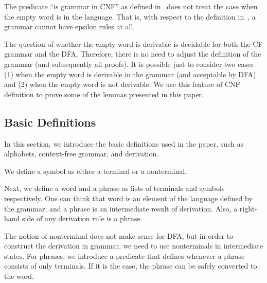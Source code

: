 The predicate ``is grammar in CNF'' as defined in~\cite{smolkaHofmann2016} does not treat the case when the empty word is in the language. That is, with respect to the definition in~\cite{smolkaHofmann2016}, a grammar cannot have epsilon rules at all.

The question of whether the empty word is derivable is decidable for both the CF grammar and the DFA. Therefore, there is no need to adjust the definition of the grammar (and subsequently all proofs). It is possible just to consider two cases (1) when the empty word is derivable in the grammar (and acceptable by DFA) and (2) when the empty word is not derivable. We use this feature of CNF definition to prove some of the lemmas presented in this paper.

\subsection{Basic Definitions}

In this section, we introduce the basic definitions used in the paper, such as alphabets, context-free grammar, and derivation.

We define a symbol as either a terminal or a nonterminal.


Next, we define a word and a phrase as lists of terminals and symbols respectively.
One can think that word is an element of the language defined by the grammar, and a phrase is an intermediate result of derivation.
Also, a right-hand side of any derivation rule is a phrase.


The notion of nonterminal does not make sense for DFA, but in order to construct the derivation in grammar, we need to use nonterminals in intermediate states. For phrases, we introduce a predicate that defines whenever a phrase consists of only terminals. If it is the case, the phrase can be safely converted to the word.

